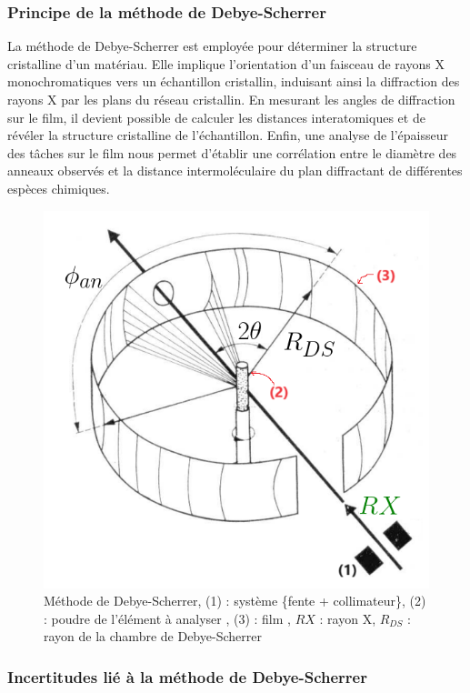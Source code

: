 \subsubsection{Principe de la méthode de Debye-Scherrer}

La méthode de Debye-Scherrer est employée pour déterminer la structure cristalline d'un matériau. Elle implique l'orientation d'un faisceau de rayons X monochromatiques vers un échantillon cristallin, induisant ainsi la diffraction des rayons X par les plans du réseau cristallin. En mesurant les angles de diffraction sur le film, il devient possible de calculer les distances interatomiques et de révéler la structure cristalline de l'échantillon. Enfin, une analyse de l'épaisseur des tâches sur le film nous permet d'établir une corrélation entre le diamètre des anneaux observés et la distance intermoléculaire du plan diffractant de différentes espèces chimiques.





\begin{figure}[h!]
	\centering
	\includegraphics[width=0.7\linewidth]{Méthode_de_Debye_Scherrer/Méthode_de_Debye_Scherrer}
	\caption{\centering Méthode de Debye-Scherrer, (1) : système \{fente + collimateur\}, (2) : poudre de l'élément à analyser , (3) : film , $RX$ : rayon X, $R_{DS}$ : rayon de la chambre de Debye-Scherrer}
	\label{fig:methodededebyescherrer}
\end{figure}
\newpage



\subsubsection{Incertitudes lié à la méthode de Debye-Scherrer}

